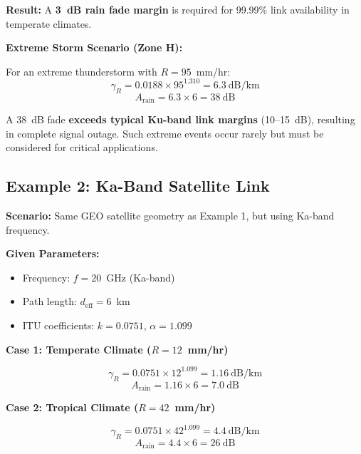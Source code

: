 \textbf{Result:} A \textbf{3~dB rain fade margin} is required for 99.99\% link availability in temperate climates.

\vspace{10pt}
\textbf{Extreme Storm Scenario (Zone H):}

For an extreme thunderstorm with $R = 95$~mm/hr:
\begin{equation}
\gamma_R = 0.0188 \times 95^{1.310} = 6.3~\text{dB/km}
\end{equation}
\begin{equation}
A_{\text{rain}} = 6.3 \times 6 = 38~\text{dB}
\end{equation}

\begin{warningbox}
A 38~dB fade \textbf{exceeds typical Ku-band link margins} (10--15~dB), resulting in complete signal outage. Such extreme events occur rarely but must be considered for critical applications.
\end{warningbox}

\subsection{Example 2: Ka-Band Satellite Link}

\textbf{Scenario:} Same GEO satellite geometry as Example 1, but using Ka-band frequency.

\vspace{6pt}
\textbf{Given Parameters:}
\begin{itemize}
\item Frequency: $f = 20$~GHz (Ka-band)
\item Path length: $d_{\text{eff}} = 6$~km
\item ITU coefficients: $k = 0.0751$, $\alpha = 1.099$
\end{itemize}

\vspace{6pt}
\textbf{Case 1: Temperate Climate ($R = 12$~mm/hr)}

\begin{equation}
\gamma_R = 0.0751 \times 12^{1.099} = 1.16~\text{dB/km}
\end{equation}
\begin{equation}
A_{\text{rain}} = 1.16 \times 6 = 7.0~\text{dB}
\end{equation}

\textbf{Case 2: Tropical Climate ($R = 42$~mm/hr)}

\begin{equation}
\gamma_R = 0.0751 \times 42^{1.099} = 4.4~\text{dB/km}
\end{equation}
\begin{equation}
A_{\text{rain}} = 4.4 \times 6 = 26~\text{dB}
\end{equation}

